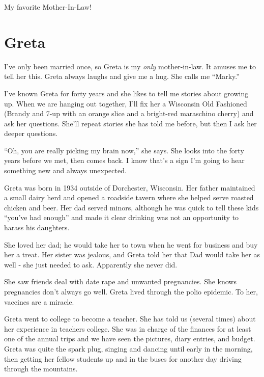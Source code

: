 \documentclass[
  letterpaper,
  DIV=11,
  numbers=noendperiod]{scrreprt}
\begin{document}
My favorite Mother-In-Law!


\chapter*{Greta}\label{greta}


I've only been married once, so Greta is my \emph{only} mother-in-law.
It amuses me to tell her this. Greta always laughs and give me a hug.
She calls me ``Marky.''

I've known Greta for forty years and she likes to tell me stories about
growing up. When we are hanging out together, I'll fix her a Wisconsin
Old Fashioned (Brandy and 7-up with an orange slice and a bright-red
maraschino cherry) and ask her questions. She'll repeat stories she has
told me before, but then I ask her deeper questions.

``Oh, you are really picking my brain now,'' she says. She looks into
the forty years before we met, then comes back. I know that's a sign I'm
going to hear something new and always unexpected.

Greta was born in 1934 outside of Dorchester, Wisconsin. Her father
maintained a small dairy herd and opened a roadside tavern where she
helped serve roasted chicken and beer. Her dad served minors, although
he was quick to tell these kids ``you've had enough'' and made it clear
drinking was not an opportunity to harass his daughters.

She loved her dad; he would take her to town when he went for business
and buy her a treat. Her sister was jealous, and Greta told her that Dad
would take her as well - she just needed to ask. Apparently she never
did.

She saw friends deal with date rape and unwanted pregnancies. She knows
pregnancies don't always go well. Greta lived through the polio
epidemic. To her, vaccines are a miracle.

Greta went to college to become a teacher. She has told us (several
times) about her experience in teachers college. She was in charge of
the finances for at least one of the annual trips and we have seen the
pictures, diary entries, and budget. Greta was quite the spark plug,
singing and dancing until early in the morning, then getting her fellow
students up and in the buses for another day driving through the
mountains.
\end{document}
